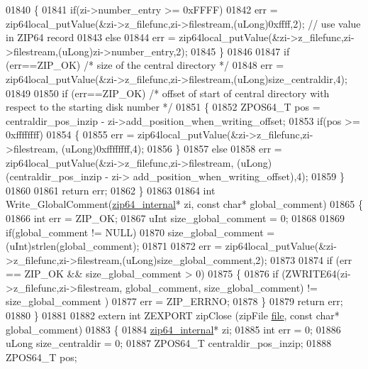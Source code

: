 \begin{DoxyCode}
01840   \{
01841     \textcolor{keywordflow}{if}(zi->number\_entry >= 0xFFFF)
01842       err = zip64local\_putValue(&zi->z\_filefunc,zi->filestream,(uLong)0xffff,2); \textcolor{comment}{// use value in ZIP64
       record}
01843     \textcolor{keywordflow}{else}
01844       err = zip64local\_putValue(&zi->z\_filefunc,zi->filestream,(uLong)zi->number\_entry,2);
01845   \}
01846 
01847   \textcolor{keywordflow}{if} (err==ZIP\_OK) \textcolor{comment}{/* size of the central directory */}
01848     err = zip64local\_putValue(&zi->z\_filefunc,zi->filestream,(uLong)size\_centraldir,4);
01849 
01850   \textcolor{keywordflow}{if} (err==ZIP\_OK) \textcolor{comment}{/* offset of start of central directory with respect to the starting disk number */}
01851   \{
01852     ZPOS64\_T pos = centraldir\_pos\_inzip - zi->add\_position\_when\_writing\_offset;
01853     \textcolor{keywordflow}{if}(pos >= 0xffffffff)
01854     \{
01855       err = zip64local\_putValue(&zi->z\_filefunc,zi->filestream, (uLong)0xffffffff,4);
01856     \}
01857     \textcolor{keywordflow}{else}
01858       err = zip64local\_putValue(&zi->z\_filefunc,zi->filestream, (uLong)(centraldir\_pos\_inzip - zi->
      add\_position\_when\_writing\_offset),4);
01859   \}
01860 
01861    \textcolor{keywordflow}{return} err;
01862 \}
01863 
01864 \textcolor{keywordtype}{int} Write\_GlobalComment(\hyperlink{structzip64__internal}{zip64\_internal}* zi, \textcolor{keyword}{const} \textcolor{keywordtype}{char}* global\_comment)
01865 \{
01866   \textcolor{keywordtype}{int} err = ZIP\_OK;
01867   uInt size\_global\_comment = 0;
01868 
01869   \textcolor{keywordflow}{if}(global\_comment != NULL)
01870     size\_global\_comment = (uInt)strlen(global\_comment);
01871 
01872   err = zip64local\_putValue(&zi->z\_filefunc,zi->filestream,(uLong)size\_global\_comment,2);
01873 
01874   \textcolor{keywordflow}{if} (err == ZIP\_OK && size\_global\_comment > 0)
01875   \{
01876     \textcolor{keywordflow}{if} (ZWRITE64(zi->z\_filefunc,zi->filestream, global\_comment, size\_global\_comment) != size\_global\_comment
      )
01877       err = ZIP\_ERRNO;
01878   \}
01879   \textcolor{keywordflow}{return} err;
01880 \}
01881 
01882 \textcolor{keyword}{extern} \textcolor{keywordtype}{int} ZEXPORT zipClose (zipFile \hyperlink{structfile}{file}, \textcolor{keyword}{const} \textcolor{keywordtype}{char}* global\_comment)
01883 \{
01884     \hyperlink{structzip64__internal}{zip64\_internal}* zi;
01885     \textcolor{keywordtype}{int} err = 0;
01886     uLong size\_centraldir = 0;
01887     ZPOS64\_T centraldir\_pos\_inzip;
01888     ZPOS64\_T pos;

\end{DoxyCode}
